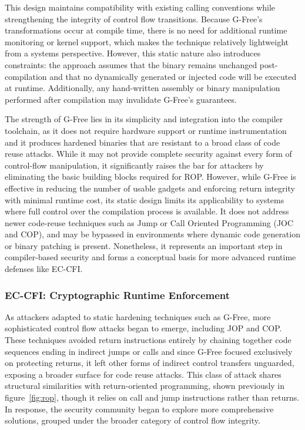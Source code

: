 \documentclass[a4paper]{usiinfbachelorproject}
\begin{document}
This design maintains compatibility with existing calling conventions while strengthening the integrity of control flow transitions. Because G-Free’s transformations occur at compile time, there is no need for additional runtime monitoring or kernel support, which makes the technique relatively lightweight from a systems perspective. However, this static nature also introduces constraints: the approach assumes that the binary remains unchanged post-compilation and that no dynamically generated or injected code will be executed at runtime. Additionally, any hand-written assembly or binary manipulation performed after compilation may invalidate G-Free’s guarantees.

The strength of G-Free lies in its simplicity and integration into the compiler toolchain, as it does not require hardware support or runtime instrumentation and it produces hardened binaries that are resistant to a broad class of code reuse attacks. While it may not provide complete security against every form of control-flow manipulation, it significantly raises the bar for attackers by eliminating the basic building blocks required for ROP. However, while G-Free is effective in reducing the number of usable gadgets and enforcing return integrity with minimal runtime cost, its static design limits its applicability to systems where full control over the compilation process is available. It does not address newer code-reuse techniques such as Jump or Call Oriented Programming (JOC and COP), and may be bypassed in environments where dynamic code generation or binary patching is present. Nonetheless, it represents an important step in compiler-based security and forms a conceptual basis for more advanced runtime defenses like EC-CFI.


\subsubsection{EC-CFI: Cryptographic Runtime Enforcement}


As attackers adapted to static hardening techniques such as G-Free, more sophisticated control flow attacks began to emerge, including JOP and COP. These techniques avoided return instructions entirely by chaining together code sequences ending in indirect jumps or calls and since G-Free focused exclusively on protecting returns, it left other forms of indirect control transfers unguarded, exposing a broader surface for code reuse attacks. This class of attack shares structural similarities with return-oriented programming, shown previously in figure~\ref{fig:rop}, though it relies on call and jump instructions rather than returns. In response, the security community began to explore more comprehensive solutions, grouped under the broader category of control flow integrity.
\end{document}
